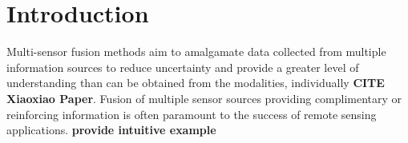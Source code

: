 \chapter{Introduction}
Multi-sensor fusion methods aim to amalgamate data collected from multiple information sources to reduce uncertainty and provide a greater level of understanding than can be obtained from the modalities, individually \textbf{CITE Xiaoxiao Paper}.  Fusion of multiple sensor sources providing complimentary or reinforcing information is often paramount to the success of remote sensing applications.  \textbf{provide intuitive example} 

